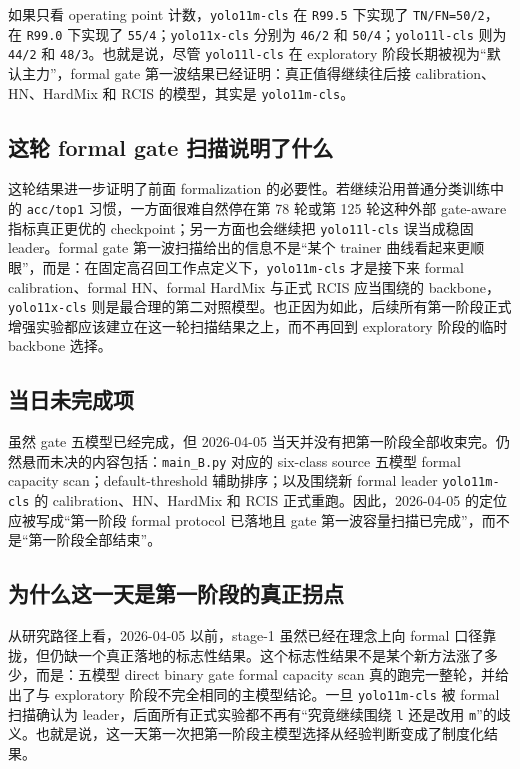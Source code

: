 \documentclass[UTF8,12pt]{ctexart}
\begin{document}
如果只看 operating point 计数，\texttt{yolo11m-cls} 在 \texttt{R99.5} 下实现了 \texttt{TN/FN=50/2}，在 \texttt{R99.0} 下实现了 \texttt{55/4}；\texttt{yolo11x-cls} 分别为 \texttt{46/2} 和 \texttt{50/4}；\texttt{yolo11l-cls} 则为 \texttt{44/2} 和 \texttt{48/3}。也就是说，尽管 \texttt{yolo11l-cls} 在 exploratory 阶段长期被视为“默认主力”，formal gate 第一波结果已经证明：真正值得继续往后接 calibration、HN、HardMix 和 RCIS 的模型，其实是 \texttt{yolo11m-cls}。

\subsection{这轮 formal gate 扫描说明了什么}
这轮结果进一步证明了前面 formalization 的必要性。若继续沿用普通分类训练中的 \texttt{acc/top1} 习惯，一方面很难自然停在第 78 轮或第 125 轮这种外部 gate-aware 指标真正更优的 checkpoint；另一方面也会继续把 \texttt{yolo11l-cls} 误当成稳固 leader。formal gate 第一波扫描给出的信息不是“某个 trainer 曲线看起来更顺眼”，而是：在固定高召回工作点定义下，\texttt{yolo11m-cls} 才是接下来 formal calibration、formal HN、formal HardMix 与正式 RCIS 应当围绕的 backbone，\texttt{yolo11x-cls} 则是最合理的第二对照模型。也正因为如此，后续所有第一阶段正式增强实验都应该建立在这一轮扫描结果之上，而不再回到 exploratory 阶段的临时 backbone 选择。

\subsection{当日未完成项}
虽然 gate 五模型已经完成，但 2026-04-05 当天并没有把第一阶段全部收束完。仍然悬而未决的内容包括：\texttt{main\_B.py} 对应的 six-class source 五模型 formal capacity scan；default-threshold 辅助排序；以及围绕新 formal leader \texttt{yolo11m-cls} 的 calibration、HN、HardMix 和 RCIS 正式重跑。因此，2026-04-05 的定位应被写成“第一阶段 formal protocol 已落地且 gate 第一波容量扫描已完成”，而不是“第一阶段全部结束”。

\subsection{为什么这一天是第一阶段的真正拐点}
从研究路径上看，2026-04-05 以前，stage-1 虽然已经在理念上向 formal 口径靠拢，但仍缺一个真正落地的标志性结果。这个标志性结果不是某个新方法涨了多少，而是：五模型 direct binary gate formal capacity scan 真的跑完一整轮，并给出了与 exploratory 阶段不完全相同的主模型结论。一旦 \texttt{yolo11m-cls} 被 formal 扫描确认为 leader，后面所有正式实验都不再有“究竟继续围绕 \texttt{l} 还是改用 \texttt{m}”的歧义。也就是说，这一天第一次把第一阶段主模型选择从经验判断变成了制度化结果。
\end{document}
